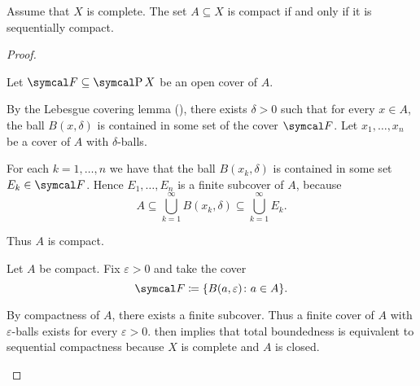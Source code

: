 \begin{theorem}\label{thm:metric_compact_iff_sequentially_compact}
  Assume that \( X \) is complete. The set \( A \subseteq X \) is compact if and only if it is sequentially compact.
\end{theorem}
\begin{proof}\mbox{}
  \begin{description}
    \Implies Let \( \Cal{F} \subseteq \Power X \) be an open cover of \( A \).

    By the Lebesgue covering lemma (), there exists \( \delta > 0 \) such that for every \( x \in A \), the ball \( B(x, \delta) \) is contained in some set of the cover \( \Cal{F} \). Let \( x_1, \ldots, x_n \) be a cover of \( A \) with \( \delta \)-balls.

    For each \( k = 1, \ldots, n \) we have that the ball \( B(x_k, \delta) \) is contained in some set \( E_k \in \Cal{F} \). Hence \( E_1, \ldots, E_n \) is a finite subcover of \( A \), because
    \begin{equation*}
      A \subseteq \bigcup_{k=1}^\infty B(x_k, \delta) \subseteq \bigcup_{k=1}^\infty E_k.
    \end{equation*}

    Thus \( A \) is compact.

    \ImpliedBy Let \( A \) be compact. Fix \( \varepsilon > 0 \) and take the cover
    \begin{equation*}
      \Cal{F} \coloneqq \{ B(a, \varepsilon) \colon a \in A \}.
    \end{equation*}

    By compactness of \( A \), there exists a finite subcover. Thus a finite cover of \( A \) with \( \varepsilon \)-balls exists for every \( \varepsilon > 0 \).  then implies that total boundedness is equivalent to sequential compactness because \( X \) is complete and \( A \) is closed.
  \end{description}
\end{proof}

